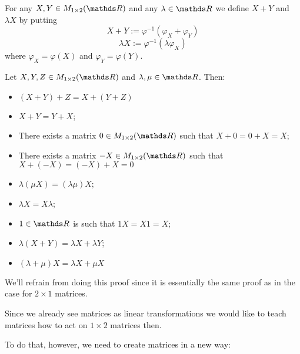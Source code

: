 \begin{df}
	For any $X,Y\in M_{1\times 2}(\R)$ and any $\lambda \in \R$ we define $X+Y$ and $\lambda X$ by putting
	\[X+Y:=\varphi^{-1}(\varphi_X+\varphi_Y)\]
	\[\lambda X:=\varphi^{-1}(\lambda\varphi_X)\]where $\varphi_X=\varphi(X)$ and $\varphi_Y=\varphi(Y)$.
\end{df}

\begin{lemma}
	Let $X,Y,Z\in M_{1\times2}(\R)$ and $\lambda,\mu\in \R$. Then:
	\begin{itemize}
		\item $(X+Y)+Z=X+(Y+Z)$
		\item $X+Y=Y+X$;
		\item There exists a matrix $0\in M_{1\times 2}(\R)$ such that $X+0=0+X=X$;
		\item There exists a matrix $-X\in M_{1\times 2}(\R)$ such that $X+(-X)=(-X)+X=0$
		\item $\lambda(\mu X)=(\lambda \mu)X$;
		\item $\lambda X=X\lambda$;
		\item $1\in \R$ is such that $1X=X1=X$;
		\item $\lambda(X+Y)=\lambda X+\lambda Y$;
		\item $(\lambda+\mu)X=\lambda X+\mu X$
	\end{itemize}
\end{lemma}

We'll refrain from doing this proof since it is essentially the same proof as in the case for $2\times 1$ matrices.

\bigskip
Since we already see matrices as linear transformations we would like to teach matrices how to act on $1\times 2$ matrices then.

To do that, however, we need to create matrices in a new way:

